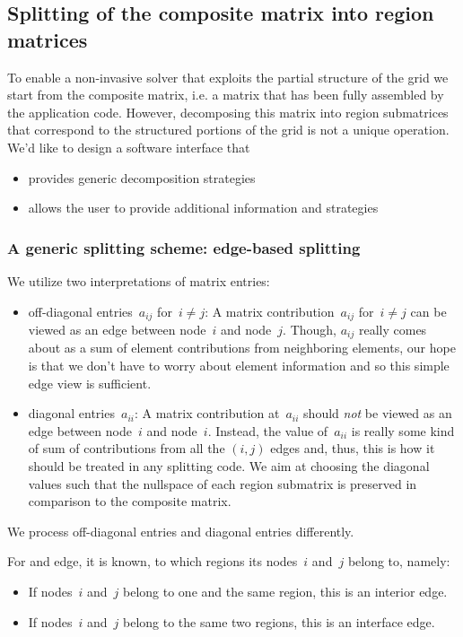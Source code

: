 \documentclass[11pt]{article}
\begin{document}
\subsection{Splitting of the composite matrix into region matrices}

To enable a non-invasive solver that exploits the partial structure of the grid
we start from the composite matrix, i.e. a matrix that has been fully assembled
by the application code. However, decomposing this matrix into region submatrices
that correspond to the structured portions of the grid is not a unique operation.
We'd like to design a software interface that
\begin{itemize}
\item provides generic decomposition strategies
\item allows the user to provide additional information and strategies
\end{itemize}

\subsubsection{A generic splitting scheme: edge-based splitting}

We utilize two interpretations of matrix entries:
\begin{itemize}
\item off-diagonal entries~$a_{ij}$ for~$i \neq j$:
A matrix contribution~$a_{ij}$ for~$i \neq j$ can be viewed as an edge between node~$i$ and node~$j$.
Though, $a_{ij}$ really comes about as a sum of element contributions from neighboring elements,
our hope is that we don't have to worry about element information and so this simple edge view is sufficient.
\item diagonal entries~$a_{ii}$:
A matrix contribution at~$a_{ii}$ should \emph{not} be viewed as an edge between node~$i$ and node~$i$.
Instead, the value of~$a_{ii}$ is really some kind of sum of contributions from all the $(i,j)$ edges
and, thus, this is how it should be treated in any splitting code. We aim at choosing the diagonal values
such that the nullspace of each region submatrix is preserved in comparison to the composite matrix.
\end{itemize}
We process off-diagonal entries and diagonal entries differently.

For and edge, it is known, to which regions its nodes~$i$ and~$j$ belong to, namely:
\begin{itemize}
\item If nodes~$i$ and~$j$ belong to one and the same region, this is an interior edge.
\item If nodes~$i$ and~$j$ belong to the same two regions, this is an interface edge.
\end{itemize}
\end{document}
